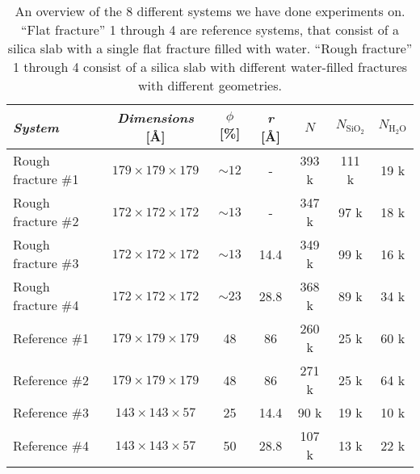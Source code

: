 \begin{table}[htpb]
\centering
    \begin{tabular}{l|cccccc}
    \textit{System}             & \textit{Dimensions} [\AA]     & $\phi$ [\%]   & \textit{r} [\AA]  & $N$       & $N_\text{SiO$_2$}$    & $N_\text{H$_2$O}$ \\ \hline 
    Rough fracture \#1          & $179 \times 179 \times 179$   & ${\sim}12$    & -                 & 393 k  & 111 k                    & 19 k           \\ %
    Rough fracture \#2          & $172 \times 172 \times 172$   & ${\sim}13$    & -                 & 347 k  & 97 k                     & 18 k            \\ %
    Rough fracture \#3          & $172 \times 172 \times 172$   & ${\sim}13$    & 14.4              & 349 k  & 99 k                     & 16 k            \\ %
    Rough fracture \#4          & $172 \times 172 \times 172$   & ${\sim}23$    & 28.8              & 368 k  & 89 k                     & 34 k            \\ %
    \hline %
    Reference \#1           & $179 \times 179 \times 179$   & 48            & 86                & 260 k     & 25 k                  & 60 k                             \\ %
    Reference \#2           & $179 \times 179 \times 179$   & 48            & 86                & 271 k     & 25 k                  & 64 k                             \\ %
    Reference \#3           & $143 \times 143 \times 57$    & 25            & 14.4              & 90 k      & 19 k                  & 10 k                             \\ %
    Reference \#4           & $143 \times 143 \times 57$    & 50            & 28.8              & 107 k     & 13 k                  & 22 k                             \\ %
    \end{tabular}%
    \vspace{8pt}
    \caption{%
        An overview of the 8 different systems we have done experiments on. ``Flat fracture'' 1 through 4 are reference systems, that consist of a silica slab with a single flat fracture filled with water. ``Rough fracture'' 1 through 4 consist of a silica slab with different water-filled fractures with different geometries.%
}
\end{table}
